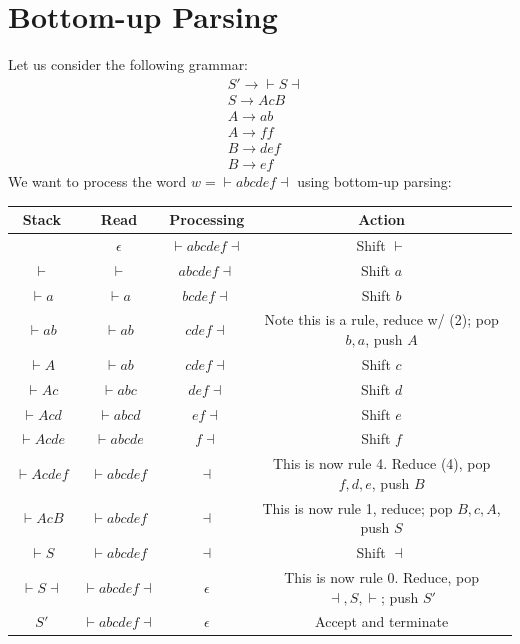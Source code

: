 \documentclass[12pt]{article}
\begin{document}
\newpage
\section{Bottom-up Parsing}
Let us consider the following grammar:
\begin{align}
    &S' \rightarrow \vdash S \dashv \\
    &S \rightarrow AcB \\
    &A \rightarrow ab \\
    &A \rightarrow ff \\
    &B \rightarrow def \\
    &B \rightarrow ef
\end{align}
We want to process the word $w = \vdash abcdef \dashv$ using bottom-up parsing:\\
\begin{center}
    \begin{tabular}{c|c|c|c}
        Stack & Read & Processing & Action \\
        \hline
            & $\epsilon$ & $\vdash abcdef \dashv$ & Shift $\vdash$ \\
            $\vdash$ & $\vdash$ & $abcdef \dashv$ & Shift $a$ \\
            $\vdash a$ & $\vdash a$ & $bcdef \dashv$ & Shift $b$ \\
            $\vdash ab$ & $\vdash ab$ & $cdef \dashv$ & Note this is a rule, reduce w/ (2); pop $b, a$, push $A$ \\
            $\vdash A$ & $\vdash ab$ & $cdef \dashv$ & Shift $c$ \\    
            $\vdash Ac$ & $\vdash abc$ & $def \dashv$ & Shift $d$ \\    
            $\vdash Acd$ & $\vdash abcd$ & $ef \dashv$ & Shift $e$ \\    
            $\vdash Acde$ & $\vdash abcde$ & $f \dashv$ & Shift $f$ \\    
            $\vdash Acdef$ & $\vdash abcdef$ & $\dashv$ & This is now rule 4.  Reduce (4), pop $f, d, e$, push $B$ \\
            $\vdash AcB$ & $\vdash abcdef$ & $\dashv$ & This is now rule 1, reduce; pop $B, c, A$, push $S$ \\
            $\vdash S$ & $\vdash abcdef$ & $\dashv$ & Shift $\dashv$ \\
            $\vdash S \dashv$ & $\vdash abcdef \dashv$ & $\epsilon$ & This is now rule 0.  Reduce, pop $\dashv, S, \vdash$; push $S'$ \\
            $S'$ & $\vdash abcdef \dashv$ & $\epsilon$ & Accept and terminate
    \end{tabular}
\end{center}
\end{document}
